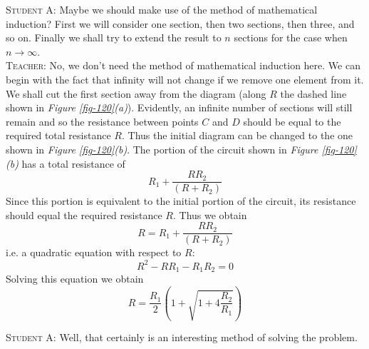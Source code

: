 \documentclass[a4paper,sfsidenotes]{tufte-book}
\begin{document}
\textsc{Student A:} Maybe we should make use of the method of mathematical induction? First we will consider one section, then two sections, then three, and so on. Finally we shall try to extend the result to $n$ sections for the case when $n \to \infty$.
\\
\textsc{Teacher:} No, we don't need the method of mathematical induction here. We can begin with the fact that infinity will not change if we remove one element from it. We shall cut the first section away from the diagram (along $R$ the dashed line shown in \emph{Figure \ref{fig-120}(a)}). Evidently, an infinite number of sections will still remain and so the resistance between points $C$ and $D$ should be equal to the required total resistance $R$. Thus the initial diagram can be changed to the one shown in \emph{Figure \ref{fig-120}(b)}. The portion of the circuit shown in \emph{Figure \ref{fig-120}(b)} has a total resistance of 
\begin{equation*}%
R_{1}+\frac{RR_{2}}{(R+R_{2})} 
\end{equation*}
Since this portion is equivalent to the initial portion of the circuit, its resistance should equal the required resistance $R$. Thus we obtain
\begin{equation*}%
R= R_{1} + \frac{RR_{2}}{(R+R_{2})} 
\end{equation*}
i.e. a quadratic equation with respect to $R$:
\begin{equation*}%
R^{2} - RR_{1} - R_{1}R_{2} = 0
\end{equation*}
Solving this equation we obtain
\begin{equation}
R = \frac{R_{1}}{2} \left( 1 + \sqrt{1 + 4 \dfrac{R_{2}}{R_{1}}}  \right)
\label{179}
\end{equation}

\textsc{Student A:} Well, that certainly is an interesting method of solving the problem.
\end{document}
